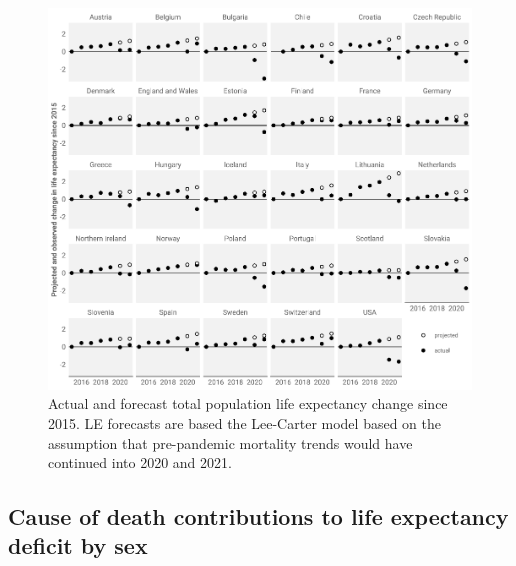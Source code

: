 \documentclass[12pt]{article}
\begin{document}
\begin{figure}[ht!]
    \centering
    \includegraphics{90-e0forecastT.pdf}
    \caption{Actual and forecast total population life expectancy change since 2015. LE forecasts are based the Lee-Carter model based on the assumption that pre-pandemic mortality trends would have continued into 2020 and 2021.}
    \label{fig:e0forecastT}
\end{figure}

\clearpage

\subsection*{Cause of death contributions to life expectancy deficit by sex}
\end{document}
